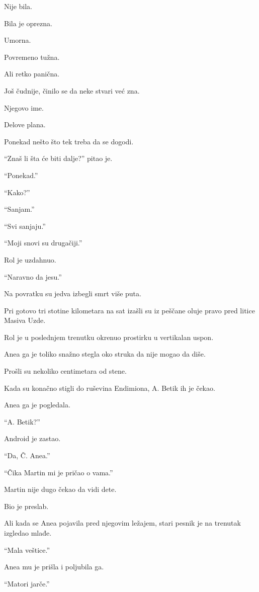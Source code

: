 Nije bila.

Bila je oprezna.

Umorna.

Povremeno tužna.

Ali retko panična.

Još čudnije, činilo se da neke stvari već zna.

Njegovo ime.

Delove plana.

Ponekad nešto što tek treba da se dogodi.

\bigskip

``Znaš li šta će biti dalje?'' pitao je.

``Ponekad.''

``Kako?''

``Sanjam.''

``Svi sanjaju.''

``Moji snovi su drugačiji.''

Rol je uzdahnuo.

``Naravno da jesu.''

\bigskip

Na povratku su jedva izbegli smrt više puta.

Pri gotovo tri stotine kilometara na sat izašli su iz peščane oluje pravo pred litice Masiva Uzde.

Rol je u poslednjem trenutku okrenuo prostirku u vertikalan uspon.

Anea ga je toliko snažno stegla oko struka da nije mogao da diše.

Prošli su nekoliko centimetara od stene.

\bigskip

Kada su konačno stigli do ruševina Endimiona, A. Betik ih je čekao.

Anea ga je pogledala.

``A. Betik?''

Android je zastao.

``Da, Č. Anea.''

``Čika Martin mi je pričao o vama.''

\bigskip

Martin nije dugo čekao da vidi dete.

Bio je preslab.

Ali kada se Anea pojavila pred njegovim ležajem, stari pesnik je na trenutak izgledao mlađe.

``Mala veštice.''

Anea mu je prišla i poljubila ga.

``Matori jarče.''

